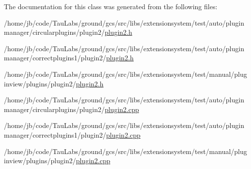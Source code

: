 \-The documentation for this class was generated from the following files\-:\begin{DoxyCompactItemize}
\item 
/home/jb/code/\-Tau\-Labs/ground/gcs/src/libs/extensionsystem/test/auto/pluginmanager/circularplugins/plugin2/\hyperlink{auto_2pluginmanager_2circularplugins_2plugin2_2plugin2_8h}{plugin2.\-h}\item 
/home/jb/code/\-Tau\-Labs/ground/gcs/src/libs/extensionsystem/test/auto/pluginmanager/correctplugins1/plugin2/\hyperlink{auto_2pluginmanager_2correctplugins1_2plugin2_2plugin2_8h}{plugin2.\-h}\item 
/home/jb/code/\-Tau\-Labs/ground/gcs/src/libs/extensionsystem/test/manual/pluginview/plugins/plugin2/\hyperlink{manual_2pluginview_2plugins_2plugin2_2plugin2_8h}{plugin2.\-h}\item 
/home/jb/code/\-Tau\-Labs/ground/gcs/src/libs/extensionsystem/test/auto/pluginmanager/circularplugins/plugin2/\hyperlink{auto_2pluginmanager_2circularplugins_2plugin2_2plugin2_8cpp}{plugin2.\-cpp}\item 
/home/jb/code/\-Tau\-Labs/ground/gcs/src/libs/extensionsystem/test/auto/pluginmanager/correctplugins1/plugin2/\hyperlink{auto_2pluginmanager_2correctplugins1_2plugin2_2plugin2_8cpp}{plugin2.\-cpp}\item 
/home/jb/code/\-Tau\-Labs/ground/gcs/src/libs/extensionsystem/test/manual/pluginview/plugins/plugin2/\hyperlink{manual_2pluginview_2plugins_2plugin2_2plugin2_8cpp}{plugin2.\-cpp}\end{DoxyCompactItemize}
